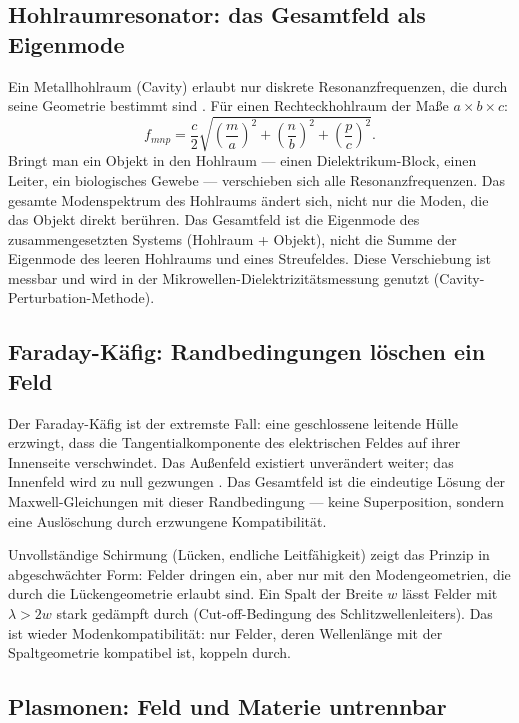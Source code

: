 \subsection*{Hohlraumresonator: das Gesamtfeld als Eigenmode}

Ein Metallhohlraum (Cavity) erlaubt nur diskrete Resonanzfrequenzen,
die durch seine Geometrie bestimmt sind \cite{Pozar2012,Griffiths1999}. Für einen Rechteckhohlraum
der Maße $a \times b \times c$:
\[
  f_{mnp} = \frac{c}{2}\sqrt{\left(\frac{m}{a}\right)^2
    + \left(\frac{n}{b}\right)^2 + \left(\frac{p}{c}\right)^2}.
\]
Bringt man ein Objekt in den Hohlraum --- einen Dielektrikum-Block,
einen Leiter, ein biologisches Gewebe --- verschieben sich alle
Resonanzfrequenzen. Das gesamte Modenspektrum des Hohlraums ändert
sich, nicht nur die Moden, die das Objekt direkt berühren. Das
Gesamtfeld ist die Eigenmode des zusammengesetzten Systems
(Hohlraum + Objekt), nicht die Summe der Eigenmode des leeren
Hohlraums und eines Streufeldes. Diese Verschiebung ist messbar
und wird in der Mikrowellen-Dielektrizitätsmessung genutzt
(Cavity-Perturbation-Methode).

\subsection*{Faraday-Käfig: Randbedingungen löschen ein Feld}

Der Faraday-Käfig ist der extremste Fall: eine geschlossene leitende
Hülle erzwingt, dass die Tangentialkomponente des elektrischen Feldes
auf ihrer Innenseite verschwindet. Das Außenfeld existiert unverändert
weiter; das Innenfeld wird zu null gezwungen \EM. Das Gesamtfeld ist
die eindeutige Lösung der Maxwell-Gleichungen mit dieser Randbedingung
--- keine Superposition, sondern eine Auslöschung durch erzwungene
Kompatibilität.

Unvollständige Schirmung (Lücken, endliche Leitfähigkeit) zeigt das
Prinzip in abgeschwächter Form: Felder dringen ein, aber nur mit den
Modengeometrien, die durch die Lückengeometrie erlaubt sind. Ein
Spalt der Breite $w$ lässt Felder mit $\lambda > 2w$ stark gedämpft
durch (Cut-off-Bedingung des Schlitzwellenleiters). Das ist wieder
Modenkompatibilität: nur Felder, deren Wellenlänge mit der
Spaltgeometrie kompatibel ist, koppeln durch.

\subsection*{Plasmonen: Feld und Materie untrennbar}

